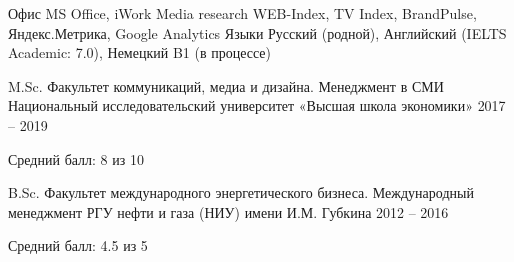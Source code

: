 \documentclass[11pt, a4paper]{awesome-cv}
\begin{document}
\begin{cvskills}
	\cvskill
		{Офис}
		{MS Office, iWork}
	\cvskill
		{Media research}
		{WEB-Index, TV Index, BrandPulse, Яндекс.Метрика, Google Analytics}
	\cvskill
		{Языки}
		{Русский (родной), Английский (IELTS Academic: 7.0), Немецкий B1 (в процессе)}
\end{cvskills}

\begin{cventries}
\cventry
	{M.Sc. Факультет коммуникаций, медиа и дизайна. Менеджмент в СМИ}
	{Национальный исследовательский университет «Высшая школа экономики»}
	{}
	{2017 -- 2019}
	{
		\begin{cvitems}
			\item {Средний балл: 8 из 10}
		\end{cvitems}
	}
	
\cventry
	{B.Sc. Факультет международного энергетического бизнеса. Международный менеджмент}
	{РГУ нефти и газа (НИУ) имени И.М. Губкина}
	{}
	{2012 -- 2016}
	{
		\begin{cvitems}
			\item {Средний балл: 4.5 из 5}
		\end{cvitems}
	}
	
\end{cventries}








































\end{document}
